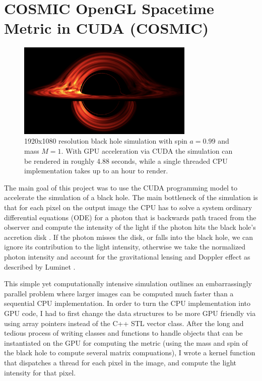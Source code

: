 \documentclass[../main.tex]{subfiles}
\begin{document}
\pagestyle{fancy}


\renewcommand{\thefigure}{\arabic{figure}}
\section*{COSMIC OpenGL Spacetime Metric in CUDA (COSMIC)}

\begin{figure}
    \centering
    \includegraphics[width=0.75\textwidth]{black_hole.png}
    \captionsetup{width=0.75\textwidth}
    \caption{1920x1080 resolution black hole simulation with
    spin $a = 0.99$ and mass $M = 1$. With GPU acceleration via
    CUDA the simulation can be rendered in roughly 4.88 seconds,
    while a single threaded CPU implementation takes up to an hour to render.}
    \label{fig:listscan}
\end{figure}

The main goal of this project was to use the CUDA programming model to
accelerate the simulation of a black hole. The main bottleneck of the simulation
is that for each pixel on the output image the CPU has to solve a system ordinary
differential equations (ODE) for a photon that is backwards path traced from the
observer and compute the intensity of the light if the photon hits the black hole's
accretion disk \cite{komissarov} \cite{macdonald}. If the photon misses the disk,
or falls into the black hole, we can ignore its contribution to the light intensity,
otherwise we take the normalized photon intensity and account for the gravitational lensing
and Doppler effect as described by Luminet \cite{luminet}.

This simple yet computationally intensive simulation outlines an embarrassingly parallel
problem where larger images can be computed much faster than a sequential
CPU implementation. In order to turn the CPU implementation into GPU code, I had
to first change the data structures to be more GPU friendly via using array pointers
instead of the C++ STL vector class. After the long and tedious process of
writing classes and functions to handle objects that can be instantiated on the GPU for
computing the metric (using the mass and spin of the black hole to compute several matrix
compuations), I wrote a kernel function that dispatches a thread for each pixel in the image,
and compute the light intensity for that pixel.
\end{document}
